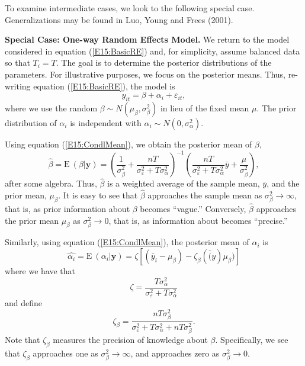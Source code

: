 To examine intermediate cases, we look to the following special
case. Generalizations may be found in Luo, Young and Frees (2001).

\linejed

\textbf{Special Case: One-way Random Effects Model.} We return to
the model considered in equation (\ref{E15:BasicRE}) and, for
simplicity, assume balanced data so that $T_i = T$. The goal is to
determine the posterior distributions of the parameters. For
illustrative purposes, we focus on the posterior means. Thus,
re-writing equation (\ref{E15:BasicRE}), the model is
\begin{equation*}
y_{it} = \beta + \alpha_i + \varepsilon_{it},
\end{equation*}
where we use the random   $\beta \sim N(\mu_{\beta},
\sigma^2_{\beta})$ in lieu of the fixed mean $\mu$. The prior
distribution of $\alpha_i$ is independent with $\alpha_i  \sim  N(0,
\sigma^2_{\alpha})$.

Using equation (\ref{E15:CondlMean}), we obtain the posterior mean
of $\beta$,
\begin{equation}
\hat{\beta} = \mathrm{E}~(\beta| \mathbf{y}) = \left(
\frac{1}{\sigma^2_{\beta}}+
\frac{nT}{\sigma^2_{\varepsilon}+T\sigma^2_{\alpha}} \right)^{-1}
\left( \frac{nT}{\sigma^2_{\varepsilon}+T\sigma^2_{\alpha}} \bar{y}
+ \frac{\mu}{\sigma^2_{\beta}} \right) ,
\end{equation}
after some algebra. Thus, $\hat{\beta}$ is a weighted average of the
sample mean, $\bar{y}$, and the prior mean,  $\mu_{\beta}$. It is
easy to see that $\hat{\beta}$ approaches the sample mean  as
$\sigma^2_{\beta} \rightarrow \infty$, that is, as prior information
about $\beta$ becomes ``vague.'' Conversely, $\hat{\beta}$
approaches the prior mean $\mu_{\beta}$ as $\sigma^2_{\beta}
\rightarrow 0$, that is, as information about becomes ``precise.''


Similarly, using equation (\ref{E15:CondlMean}), the posterior mean
of $\alpha_i$ is
\begin{equation*}
\hat{\alpha_i} = \mathrm{E}~(\alpha_i | \mathbf{y}) = \zeta \left[ (
\bar{y}_i - \mu_{\beta} ) - \zeta_{\beta} (\bar(y) \mu_{\beta} )
\right]
\end{equation*}
where we have that
\begin{equation*}
\zeta = \frac{T \sigma^2_{\alpha}}{\sigma^2_{\varepsilon}+T
\sigma^2_{\alpha}}
\end{equation*}
and define
\begin{equation*}
\zeta_{\beta} = \frac{nT \sigma^2_{\beta}}{\sigma^2_{\varepsilon}+T
\sigma^2_{\alpha}+nT \sigma^2_{\beta}} .
\end{equation*}
Note that $\zeta_{\beta}$ measures the precision of knowledge about
$\beta$. Specifically, we see that $\zeta_{\beta}$ approaches one as
$\sigma^2_{\beta} \rightarrow \infty$, and approaches zero as
$\sigma^2_{\beta} \rightarrow 0$.

